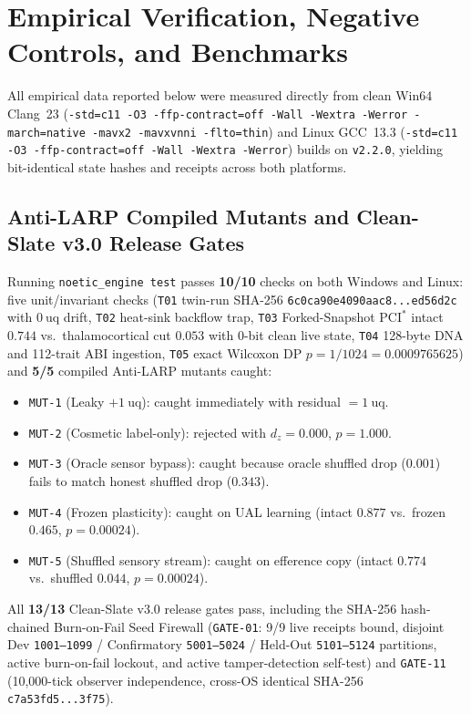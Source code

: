 \documentclass[11pt,reqno]{amsart}
\theoremstyle{remark}
\begin{document}
\section{Empirical Verification, Negative Controls, and Benchmarks}
\label{sec:empirical}

All empirical data reported below were measured directly from clean Win64 Clang~23 (\texttt{-std=c11 -O3 -ffp-contract=off -Wall -Wextra -Werror -march=native -mavx2 -mavxvnni -flto=thin}) and Linux GCC~13.3 (\texttt{-std=c11 -O3 -ffp-contract=off -Wall -Wextra -Werror}) builds on \texttt{v2.2.0}, yielding bit-identical state hashes and receipts across both platforms.

\subsection{Anti-LARP Compiled Mutants and Clean-Slate v3.0 Release Gates}
\label{subsec:mutants}

Running \texttt{noetic\_engine test} passes \textbf{10/10} checks on both Windows and Linux: five unit/invariant checks (\texttt{T01} twin-run SHA-256 \texttt{6c0ca90e4090aac8...ed56d2c} with $0~\text{uq}$ drift, \texttt{T02} heat-sink backflow trap, \texttt{T03} Forked-Snapshot $\text{PCI}^*$ intact $0.744$ vs.\ thalamocortical cut $0.053$ with 0-bit clean live state, \texttt{T04} 128-byte DNA and 112-trait ABI ingestion, \texttt{T05} exact Wilcoxon DP $p = 1/1024 = 0.0009765625$) and \textbf{5/5} compiled Anti-LARP mutants caught:
\begin{itemize}[leftmargin=1.8em, itemsep=1.5pt]
  \item \texttt{MUT-1} (Leaky $+1~\text{uq}$): caught immediately with residual $= 1~\text{uq}$.
  \item \texttt{MUT-2} (Cosmetic label-only): rejected with $d_z = 0.000$, $p = 1.000$.
  \item \texttt{MUT-3} (Oracle sensor bypass): caught because oracle shuffled drop ($0.001$) fails to match honest shuffled drop ($0.343$).
  \item \texttt{MUT-4} (Frozen plasticity): caught on UAL learning (intact $0.877$ vs.\ frozen $0.465$, $p = 0.00024$).
  \item \texttt{MUT-5} (Shuffled sensory stream): caught on efference copy (intact $0.774$ vs.\ shuffled $0.044$, $p = 0.00024$).
\end{itemize}
All \textbf{13/13} Clean-Slate v3.0 release gates pass, including the SHA-256 hash-chained Burn-on-Fail Seed Firewall (\texttt{GATE-01}: 9/9 live receipts bound, disjoint Dev \texttt{1001--1099} / Confirmatory \texttt{5001--5024} / Held-Out \texttt{5101--5124} partitions, active burn-on-fail lockout, and active tamper-detection self-test) and \texttt{GATE-11} (10,000-tick observer independence, cross-OS identical SHA-256 \texttt{c7a53fd5...3f75}).
\end{document}
